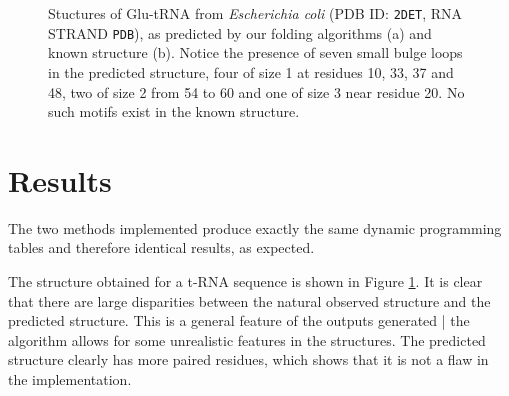\documentclass[journal]{IEEEtran}
\begin{document}
\begin{figure}[t]
\centering
{}
\hfil
{}
\caption{Stuctures of Glu-tRNA from \textit{Escherichia coli} (PDB ID: \texttt{2DET}, RNA STRAND \texttt{PDB}), as predicted by our folding algorithms (a) and known structure (b). Notice the presence of seven small bulge loops in the predicted structure, four of size 1 at residues 10, 33, 37 and 48, two of size 2 from 54 to 60 and one of size 3 near residue 20. No such motifs exist in the known structure.}
\label{structures}
\end{figure}


\section{Results}


The two methods implemented produce exactly the same dynamic programming tables and therefore identical results, as expected.



The structure obtained for a t-RNA sequence is shown in Figure \ref{structures}. It is clear that there are large disparities between the natural observed structure and the predicted structure. This is a general feature of the outputs generated | the algorithm allows for some unrealistic features in the structures. The predicted structure clearly has more paired residues, which shows that it is not a flaw in the implementation.
\end{document}
